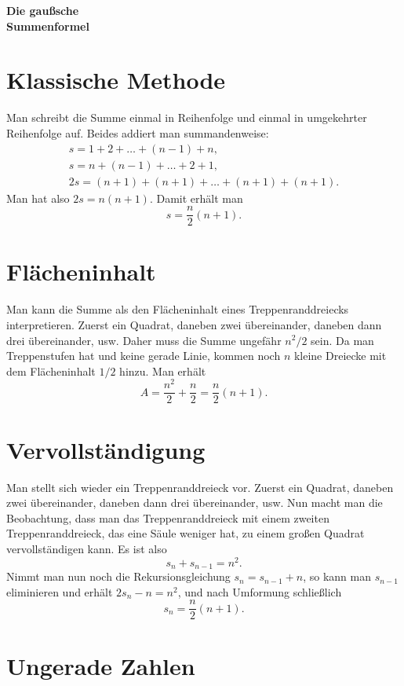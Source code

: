 \documentclass[a4paper,11pt,fleqn,twocolumn,twoside]{scrartcl}
\begin{document}
\thispagestyle{empty}

\begin{huge}
\noindent
\textbf{Die gaußsche\\
Summenformel}
\par
\end{huge}


\section{Klassische Methode}

Man schreibt die Summe einmal in Reihenfolge und einmal in
umgekehrter Reihenfolge auf. Beides addiert man summandenweise:%
\begin{gather*}
s = 1+2+\ldots+(n-1)+n,\\
s = n+(n-1)+\ldots+2+1,\\
2s = (n+1)+(n+1)+\ldots+(n+1)+(n+1).
\end{gather*}
Man hat also $2s=n(n+1)$. Damit erhält man
\[s = \frac{n}{2}(n+1).\]


\section{Flächeninhalt}

Man kann die Summe als den Flächeninhalt eines Treppenranddreiecks
interpretieren. Zuerst ein Quadrat, daneben zwei übereinander,
daneben dann drei übereinander, usw.
Daher muss die Summe ungefähr $n^2/2$ sein. Da man Treppenstufen
hat und keine gerade Linie, kommen noch $n$ kleine Dreiecke mit
dem Flächeninhalt $1/2$ hinzu. Man erhält%
\[A = \frac{n^2}{2}+\frac{n}{2} = \frac{n}{2}(n+1).\]


\section{Vervollständigung}

Man stellt sich wieder ein Treppenranddreieck vor.
Zuerst ein Quadrat, daneben zwei übereinander, daneben dann drei
übereinander, usw. Nun macht man die Beobachtung, dass man das
Treppenranddreieck mit einem zweiten Treppenranddreieck, das eine
Säule weniger hat, zu einem großen Quadrat vervollständigen kann.
Es ist also%
\[s_n+s_{n-1} = n^2.\]
Nimmt man nun noch die Rekursionsgleichung $s_{n}=s_{n-1}+n$,
so kann man $s_{n-1}$ eliminieren und erhält $2s_n-n = n^2$,
und nach Umformung schließlich%
\[s_n = \frac{n}{2}(n+1).\]


\section{Ungerade Zahlen}
\end{document}
